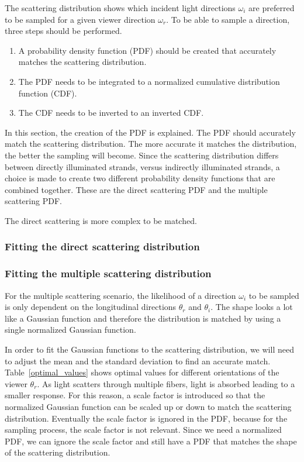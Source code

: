 \documentclass[11pt,a4paper]{report}
\begin{document}
The scattering distribution shows which incident light directions $\omega_i$ are preferred to be sampled for a given viewer direction $\omega_r$. To be able to sample a direction, three steps should be performed. 

\begin{enumerate}
\item A probability density function (PDF) should be created that accurately matches the scattering distribution.
\item The PDF needs to be integrated to a normalized cumulative distribution function (CDF).
\item The CDF needs to be inverted to an inverted CDF.
\end{enumerate}

In this section, the creation of the PDF is explained. The PDF should  accurately match the scattering distribution. The more accurate it matches the distribution, the better the sampling will become. Since the scattering distribution differs between directly illuminated strands, versus indirectly illuminated strands, a choice is made to create two different probability density functions that are combined together. These are the direct scattering PDF and the multiple scattering PDF.



 The direct scattering is more complex to be matched. 

\subsubsection{Fitting the direct scattering distribution}

\subsubsection{Fitting the multiple scattering distribution}


For the multiple scattering scenario, the likelihood of a direction $\omega_i$ to be sampled is only dependent on the longitudinal directions $\theta_r$ and $\theta_i$. The shape looks a lot like a Gaussian function and therefore the distribution is matched by using a single normalized Gaussian function.

In order to fit the Gaussian functions to the scattering distribution, we will need to adjust the mean and the standard deviation to find an accurate match. Table~\ref{optimal_values} shows optimal values for different orientations of the viewer $\theta_r$. As light scatters through multiple fibers, light is absorbed leading to a smaller response. For this reason, a scale factor is introduced so that the normalized Gaussian function can be scaled up or down to match the scattering distribution. Eventually the scale factor is ignored in the PDF, because for the sampling process, the scale factor is not relevant. Since we need a normalized PDF, we can ignore the scale factor and still have a PDF that matches the shape of the scattering distribution.
\end{document}
